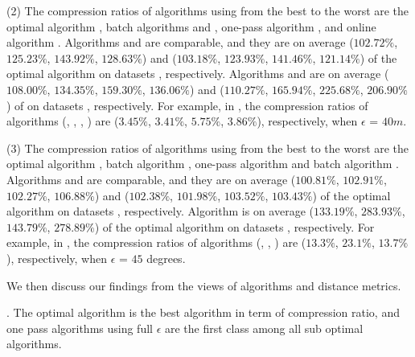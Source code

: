 (2) The compression ratios of algorithms using \sed from the best
to the worst are the optimal algorithm \opt, batch algorithms \tpa and
\dpa, one-pass algorithm \cised, and online algorithm \squishe.
%
{Algorithms \tpa and \dpa are comparable, and they are on average
($102.72\%$, $125.23\%$, $143.92\%$, $128.63\%$) and ($103.18\%$, $123.93\%$, $141.46\%$, $121.14\%$)
 of the optimal algorithm \opt on datasets \dSets, respectively.}
%
{Algorithms \cised and \squishe are on average ($108.00\%$,
  $134.35\%$, $159.30\%$, $136.06\%$) and ($110.27\%$, $165.94\%$, $225.68\%$, $206.90\%$)
 of \opt on datasets \dSets, respectively.}
%
For example, in \mopsi, the compression ratios of algorithms
(\tpa, \dpa, \squishe, \cised)
are ($3.45\%$, $3.41\%$, $5.75\%$, $3.86\%$), respectively, when $\epsilon$ = $40m$.
%
%
%

(3) The compression ratios of algorithms using \dad from the best
to the worst are the optimal algorithm \opt, batch algorithm \tpa,
one-pass algorithm \interval and batch algorithm \dpa.
%
{Algorithms \tpa and \interval are comparable, and they are on average
($100.81\%$, $102.91\%$, $102.27\%$, $106.88\%$) and ($102.38\%$, $101.98\%$, $103.52\%$, $103.43\%$)
 of the optimal algorithm \opt on datasets \dSets, respectively.}
%
{Algorithm \dpa is on average ($133.19\%$, $283.93\%$, $143.79\%$, $278.89\%$)
 of the optimal algorithm \opt on datasets \dSets, respectively.}
%
For example, in \mopsi, the compression ratios of algorithms (\tpa, \dpa, \interval)
are ($13.3\%$, $23.1\%$, $13.7\%$), respectively, when $\epsilon$ = $45$ degrees.
%


We then discuss our findings from the views of \lsa algorithms and distance metrics.

. The optimal algorithm is the best algorithm in term of compression ratio, and one pass algorithms using full $\epsilon$ are the first class among all sub optimal algorithms.

